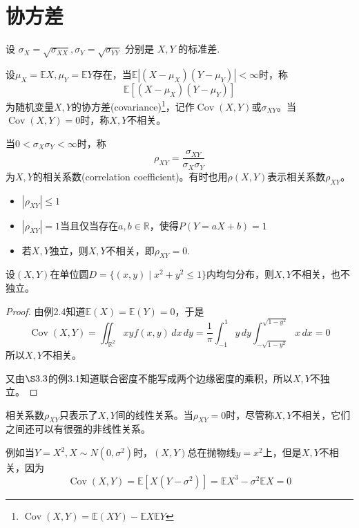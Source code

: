 \section{协方差}

设 $\sigma_X=\sqrt{\sigma_{X X}}, \sigma_Y=\sqrt{\sigma_{Y Y}}$ 分别是 $X, Y$ 的标准差.

\begin{definition}[协方差]
    设$\mu_X=\mathbb{E}X,\mu_Y=\mathbb{E}Y$存在，当$\mathbb{E}|(X-\mu_X)(Y-\mu_Y)|<\infty$时，称
    \[
        \mathbb{E}[(X-\mu_X)(Y-\mu_Y)]
    \]
    为随机变量$X,Y$的协方差(covariance)\footnote{$\operatorname{Cov}(X,Y)=\mathbb{E}(XY)-\mathbb{E}X\mathbb{E}Y$}，记作$\operatorname{Cov}(X,Y)$或$\sigma_{XY}$。当$\operatorname{Cov}(X,Y)=0$时，称$X,Y$不相关。
\end{definition}

\begin{definition}[相关系数]
    当$0<\sigma_X\sigma_Y<\infty$时，称
    \[
        \rho_{XY}=\frac{\sigma_{XY}}{\sigma_X\sigma_Y}
    \]
    为$X,Y$的相关系数(correlation coefficient)。有时也用$\rho(X,Y)$表示相关系数$\rho_{XY}$。
\end{definition}
\begin{itemize}
    \item $|\rho_{XY}|\le 1$
    \item $|\rho_{XY}|=1$当且仅当存在$a,b\in\mathbb{R}$，使得$P(Y=aX+b)=1$
    \item 若$X,Y$独立，则$X,Y$不相关，即$\rho_{XY}=0$.
\end{itemize}
\begin{example}
    设$(X,Y)$在单位圆$D=\{(x,y)\mid x^2+y^2\le 1\}$内均匀分布，则$X,Y$不相关，也不独立。
\end{example}
\begin{proof}
    由例2.4知道$\mathbb{E}(X)=\mathbb{E}(Y)=0$，于是
    \[
        \operatorname{Cov}(X,Y)=\iint_{\mathbb{R}^2} xy f(x,y)\,dx\,dy=\frac{1}{\pi}\int_{-1}^1 y\,dy\int_{-\sqrt{1-y^2}}^{\sqrt{1-y^2}} x\,dx=0
    \]
    所以$X,Y$不相关。

    又由$\S 3.3$的例3.1知道联合密度不能写成两个边缘密度的乘积，所以$X,Y$不独立。
\end{proof}
\begin{remark}
    相关系数$\rho_{XY}$只表示了$X,Y$间的线性关系。当$\rho_{XY}=0$时，尽管称$X,Y$不相关，它们之间还可以有很强的非线性关系。

    例如当$Y=X^2,X\sim N(0,\sigma^2)$时，$(X,Y)$总在抛物线$y=x^2$上，但是$X,Y$不相关，因为
    \[
        \operatorname{Cov}(X,Y)=\mathbb{E}[X(Y-\sigma^2)]=\mathbb{E}X^3-\sigma^2\mathbb{E}X=0
    \]
\end{remark}

